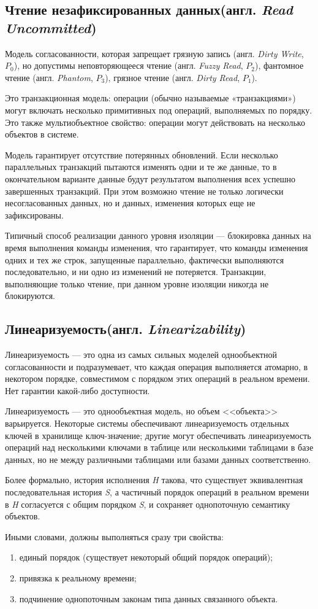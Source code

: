 \documentclass[12pt,  openany]{book}
\begin{document}
\subsection{Чтение незафиксированных данных(англ.  \textit{Read Uncommitted})}
Модель согласованности, которая запрещает грязную запись (англ. \textit{Dirty Write}, $P_0$), но допустимы неповторяющееся чтение (англ. \textit{Fuzzy Read}, $P_2$),  фантомное чтение (англ. \textit{Phantom}, $P_3$), грязное чтение (англ.  \textit{Dirty Read},  $P_1$).
\par
Это транзакционная модель: операции (обычно называемые «транзакциями») могут включать несколько примитивных под операций, выполняемых по порядку. Это также мультиобъектное свойство: операции могут действовать на несколько объектов в системе.
\par
Модель гарантирует отсутствие потерянных обновлений. Если несколько параллельных транзакций пытаются изменять одни и те же данные, то в окончательном варианте данные  будут результатом выполнения всех успешно завершенных транзакций. При этом возможно чтение не только логически несогласованных данных, но и данных, изменения которых еще не зафиксированы.
\par
Типичный способ реализации данного уровня изоляции — блокировка данных на время выполнения команды изменения, что гарантирует, что команды изменения одних и тех же строк, запущенные параллельно, фактически выполняются последовательно, и ни одно из изменений не потеряется. Транзакции, выполняющие только чтение, при данном уровне изоляции никогда не блокируются.

\subsection{Линеаризуемость(англ.  \textit{Linearizability})}
Линеаризуемость --- это одна из самых сильных моделей однообъектной согласованности и подразумевает, что каждая операция выполняется атомарно, в некотором порядке, совместимом с порядком этих операций в реальном времени.  Нет гарантии какой-либо доступности.
\par
Линеаризуемость --- это однообъектная модель, но объем <<объекта>> варьируется. Некоторые системы обеспечивают линеаризуемость отдельных ключей в хранилище ключ-значение; другие могут обеспечивать линеаризуемость операций над несколькими ключами в таблице или несколькими таблицами в базе данных, но не между различными таблицами или базами данных соответственно.
\par
Более формально, история исполнения \textit{H} такова, что существует эквивалентная последовательная история \textit{S}, а частичный порядок операций в реальном времени в \textit{H}  согласуется с общим порядком \textit{S}, и сохраняет однопоточную семантику объектов.
\par
Иными словами, должны выполняться сразу три свойства: 
\begin{enumerate}
\item единый порядок (существует некоторый общий порядок операций);
\item привязка к реальному времени;
\item подчинение однопоточным законам типа данных связанного объекта.
\end{enumerate}
\end{document}
